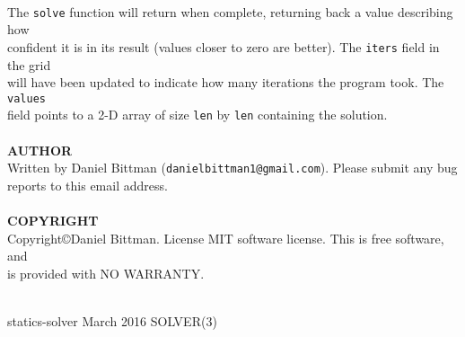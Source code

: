 \begin{tabbing}
	\\
	\> The \texttt{solve} function will return when complete, returning back a value describing how\\
	\> confident it is in its result (values closer to zero are better). The \texttt{iters} field in the grid\\
	\> will have been updated to indicate how many iterations the program took. The \texttt{values}\\
	\> field points to a 2-D array of size \texttt{len} by \texttt{len} containing the solution.\\
	\\
	\textbf{AUTHOR}\\
	\> Written by Daniel Bittman (\texttt{danielbittman1@gmail.com}). Please submit any bug\\
	\> reports to this email address.\\
	\\
	\textbf{COPYRIGHT}\\
	\> Copyright\copyright Daniel Bittman. License MIT software license. This is free software, and\\
	\> is provided with NO WARRANTY.\\
	\\

\end{tabbing}
\begin{flushleft}
	statics-solver
	\hfill March 2016 \hfill
	SOLVER(3)
\end{flushleft}

